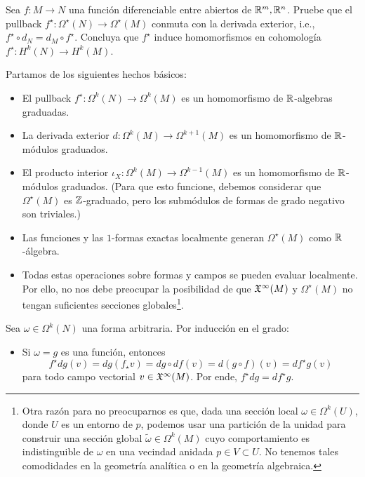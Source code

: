 \begin{exercise}
Sea $f : M \to N$ una función diferenciable entre abiertos de $\mathbb R^m, \mathbb R^n$. Pruebe que el pullback $f^\star : \Omega^\star(N) \to \Omega^\star(M)$ conmuta con la derivada exterior, i.e., $f^\star \circ d_N = d_M \circ f^\star$. Concluya que $f^\star$ induce homomorfismos en cohomología $f^\star : H^k(N) \to H^k(M)$.
\end{exercise}

\begin{solution}
Partamos de los siguientes hechos básicos:
\begin{itemize}
    \item El pullback $f^\star : \Omega^k(N) \to \Omega^k(M)$ es un homomorfismo de $\mathbb R$-algebras graduadas.
    
    \item La derivada exterior $d : \Omega^k(M) \to \Omega^{k+1}(M)$ es un homomorfismo de $\mathbb R$-módulos graduados.
    
    \item El producto interior $\iota_X : \Omega^k(M) \to \Omega^{k-1}(M)$ es un homomorfismo de $\mathbb R$-módulos graduados. (Para que esto funcione, debemos considerar que $\Omega^\star(M)$ es $\mathbb Z$-graduado, pero los submódulos de formas de grado negativo son triviales.)
    
    \item Las funciones y las $1$-formas exactas localmente generan $\Omega^\star(M)$ como $\mathbb R$-álgebra.
    
    \item Todas estas operaciones sobre formas y campos se pueden evaluar localmente. Por ello, no nos debe preocupar la posibilidad de que $\mathfrak X^\infty(M)$ y $\Omega^\star(M)$ no tengan suficientes secciones globales\footnote{Otra razón para no preocuparnos es que, dada una sección local $\omega \in \Omega^k(U)$, donde $U$ es un entorno de $p$, podemos usar una partición de la unidad para construir una sección global $\tilde \omega \in \Omega^k(M)$ cuyo comportamiento es indistinguible de $\omega$ en una vecindad anidada $p \in V \subset U$. No tenemos tales comodidades en la geometría analítica o en la geometría algebraica.}.
\end{itemize}
Sea $\omega \in \Omega^k(N)$ una forma arbitraria. Por inducción en el grado:
\begin{itemize}
    \item Si $\omega = g$ es una función, entonces
    $$f^\star dg(v) = dg(f_\star v) = dg \circ df(v) = d(g \circ f)(v) = df^\star g(v)$$
    para todo campo vectorial $v \in \mathfrak X^\infty(M)$. Por ende, $f^\star dg = df^\star g$.
    

\end{itemize}
\end{solution}
